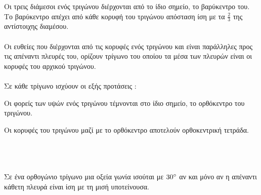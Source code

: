 \documentclass[twoside,nofonts,ektypwsh,shmeiwseis]{thewria}
\begin{document}
Οι τρεις διάμεσοι ενός τριγώνου διέρχονται από το ίδιο σημείο, το βαρύκεντρο του. Το βαρύκεντρο απέχει από κάθε κορυφή του τριγώνου απόσταση ίση με τα $ \frac{2}{3} $ της αντίστοιχης διαμέσου.\\\\
Οι ευθείες που διέρχονται από τις κορυφές ενός τριγώνου και είναι παράλληλες προς τις απέναντι πλευρές του, ορίζουν τρίγωνο του οποίου τα μέσα των πλευρών είναι οι κορυφές του αρχικού τριγώνου.\\\\
Σε κάθε τρίγωνο ισχύουν οι εξής προτάσεις :
\begin{rlist}
\item Οι φορείς των υψών ενός τριγώνου τέμνονται στο ίδιο σημείο, το ορθόκεντρο του τριγώνου.
\item Οι κορυφές του τριγώνου μαζί με το ορθόκεντρο αποτελούν ορθοκεντρική τετράδα.
\end{rlist}
\mbox{}\\\\\\
Σε ένα ορθογώνιο τρίγωνο μια οξεία γωνία ισούται με $ 30\degree $ αν και μόνο αν η απέναντι κάθετη πλευρά είναι ίση με τη μισή υποτείνουσα.\\\\
\end{document}
